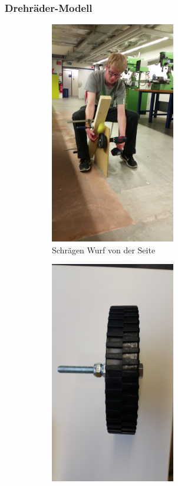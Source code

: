 \newpage
\subsubsection{Drehräder-Modell}
\begin{figure}[h!]
	\centering
	\begin{subfigure}{.4\textwidth}
		\centering
		\includegraphics[width=0.6\textwidth]{../../fig/Versuch_Drehrad.png}
		\caption{Schrägen Wurf von der Seite}
		\label{fig:Aufbau der Versuch}
	\end{subfigure} %
	\begin{subfigure}{.4\textwidth}
		\centering
		\includegraphics[width=0.6\textwidth]{../../fig/Drehrad_1.jpg}

\end{subfigure}
\end{figure}
